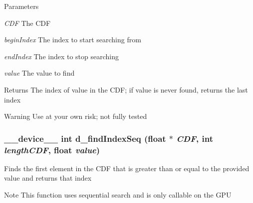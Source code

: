 \begin{DoxyParams}{Parameters}
\item[{\em CDF}]The CDF \item[{\em beginIndex}]The index to start searching from \item[{\em endIndex}]The index to stop searching \item[{\em value}]The value to find \end{DoxyParams}
\begin{DoxyReturn}{Returns}
The index of value in the CDF; if value is never found, returns the last index 
\end{DoxyReturn}
\begin{DoxyWarning}{Warning}
Use at your own risk; not fully tested 
\end{DoxyWarning}
\hypertarget{ex__particle__CUDA__naive_8cu_ab34812b8ea6a39f94f261d2e64ae2f0f}{
\subsubsection[{d\_\-findIndexSeq}]{\setlength{\rightskip}{0pt plus 5cm}\_\-\_\-device\_\-\_\- int d\_\-findIndexSeq (float $\ast$ {\em CDF}, \/  int {\em lengthCDF}, \/  float {\em value})}}
\label{ex__particle__CUDA__naive_8cu_ab34812b8ea6a39f94f261d2e64ae2f0f}
Finds the first element in the CDF that is greater than or equal to the provided value and returns that index \begin{DoxyNote}{Note}
This function uses sequential search and is only callable on the GPU 
\end{DoxyNote}


